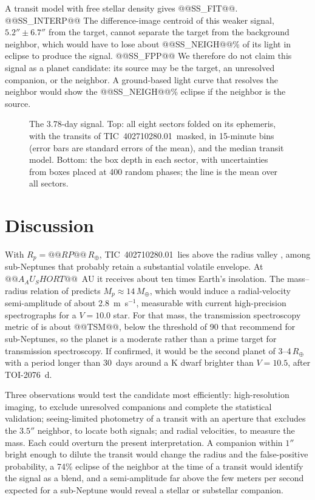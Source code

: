\documentclass[twocolumn,linenumbers]{aastex701}
\newcommand{\planet}{TIC~402710280.01}
\newcommand{\rearth}{R_\oplus}
\begin{document}
A transit model with free stellar density gives @@SS_FIT@@. @@SS_INTERP@@ The difference-image centroid of this weaker signal, $5.2'' \pm 6.7''$ from the target, cannot separate the target from the background neighbor, which would have to lose about @@SS_NEIGH@@\% of its light in eclipse to produce the signal. @@SS_FPP@@ We therefore do not claim this signal as a planet candidate: its source may be the target, an unresolved companion, or the neighbor. A ground-based light curve that resolves the neighbor would show the @@SS_NEIGH@@\% eclipse if the neighbor is the source.

\begin{figure}
\caption{The 3.78-day signal. Top: all eight sectors folded on its ephemeris, with the transits of \planet\ masked, in 15-minute bins (error bars are standard errors of the mean), and the median transit model. Bottom: the box depth in each sector, with uncertainties from boxes placed at 400 random phases; the line is the mean over all sectors.\label{fig:second}}
\end{figure}

\section{Discussion} \label{sec:discussion}

With $R_p = @@RP@@\,\rearth$, \planet\ lies above the radius valley \citep{Fulton2017}, among sub-Neptunes that probably retain a substantial volatile envelope. At $@@A_AU_SHORT@@$~AU it receives about ten times Earth's insolation. The mass--radius relation of \citet{ChenKipping2017} predicts $M_p \approx 14\,M_\oplus$, which would induce a radial-velocity semi-amplitude of about 2.8~m~s$^{-1}$, measurable with current high-precision spectrographs for a $V = 10.0$ star. For that mass, the transmission spectroscopy metric of \citet{Kempton2018} is about @@TSM@@, below the threshold of 90 that \citet{Kempton2018} recommend for sub-Neptunes, so the planet is a moderate rather than a prime target for transmission spectroscopy. If confirmed, it would be the second planet of 3--4\,$\rearth$ with a period longer than 30~days around a K dwarf brighter than $V = 10.5$, after TOI-2076~d.

Three observations would test the candidate most efficiently: high-resolution imaging, to exclude unresolved companions and complete the statistical validation; seeing-limited photometry of a transit with an aperture that excludes the $3.5''$ neighbor, to locate both signals; and radial velocities, to measure the mass. Each could overturn the present interpretation. A companion within $1''$ bright enough to dilute the transit would change the radius and the false-positive probability, a 74\% eclipse of the neighbor at the time of a transit would identify the signal as a blend, and a semi-amplitude far above the few meters per second expected for a sub-Neptune would reveal a stellar or substellar companion.
\end{document}
